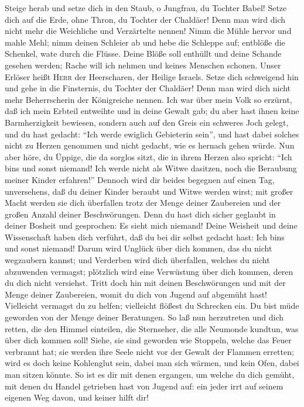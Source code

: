  Steige herab und setze dich in den Staub, o Jungfrau, du
Tochter Babel! Setze dich auf die Erde, ohne Thron, du Tochter der
Chaldäer! Denn man wird dich nicht mehr die Weichliche und Verzärtelte
nennen!  Nimm die Mühle hervor und mahle Mehl; nimm deinen
Schleier ab und hebe die Schleppe auf; entblöße die Schenkel, wate durch
die Flüsse.  Deine Blöße soll enthüllt und deine Schande
gesehen werden; Rache will ich nehmen und keines Menschen schonen.
 Unser Erlöser heißt \textsc{Herr} der Heerscharen, der
Heilige Israels.  Setze dich schweigend hin und gehe in
die Finsternis, du Tochter der Chaldäer! Denn man wird dich nicht mehr
Beherrscherin der Königreiche nennen.  Ich war über mein
Volk so erzürnt, daß ich mein Erbteil entweihte und in deine Gewalt gab;
du aber hast ihnen keine Barmherzigkeit bewiesen, sondern auch auf den
Greis ein schweres Joch gelegt,  und du hast gedacht:
``Ich werde ewiglich Gebieterin sein'', und hast dabei solches nicht zu
Herzen genommen und nicht gedacht, wie es hernach gehen würde.
 Nun aber höre, du Üppige, die da sorglos sitzt, die in
ihrem Herzen also spricht: ``Ich bin\textquotesingle s und sonst
niemand! Ich werde nicht als Witwe dasitzen, noch die Beraubung meiner
Kinder erfahren!''  Dennoch wird dir beides begegnen auf
einen Tag, unversehens, daß du deiner Kinder beraubt und Witwe werden
wirst; mit großer Macht werden sie dich überfallen trotz der Menge
deiner Zaubereien und der großen Anzahl deiner Beschwörungen.
 Denn du hast dich sicher geglaubt in deiner Bosheit und
gesprochen: Es sieht mich niemand! Deine Weisheit und deine Wissenschaft
haben dich verführt, daß du bei dir selbst gedacht hast: Ich
bin\textquotesingle s und sonst niemand!  Darum wird
Unglück über dich kommen, das du nicht wegzaubern kannst; und Verderben
wird dich überfallen, welches du nicht abzuwenden vermagst; plötzlich
wird eine Verwüstung über dich kommen, deren du dich nicht versiehst.
 Tritt doch hin mit deinen Beschwörungen und mit der
Menge deiner Zaubereien, womit du dich von Jugend auf abgemüht hast!
Vielleicht vermagst du zu helfen; vielleicht flößest du Schrecken ein.
 Du bist müde geworden von der Menge deiner Beratungen.
So laß nun herzutreten und dich retten, die den Himmel einteilen, die
Sternseher, die alle Neumonde kundtun, was über dich kommen soll!
 Siehe, sie sind geworden wie Stoppeln, welche das Feuer
verbrannt hat; sie werden ihre Seele nicht vor der Gewalt der Flammen
erretten; wird es doch keine Kohlenglut sein, dabei man sich wärmen, und
kein Ofen, dabei man sitzen könnte.  So ist es dir mit
denen ergangen, um welche du dich gemüht, mit denen du Handel getrieben
hast von Jugend auf: ein jeder irrt auf seinem eigenen Weg davon, und
keiner hilft dir!


